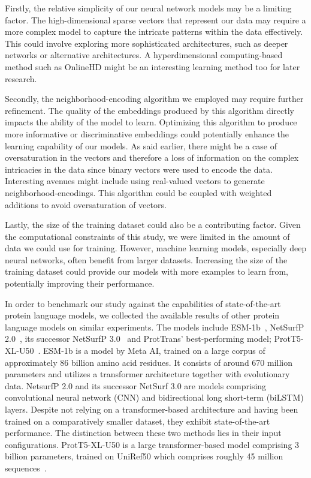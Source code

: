 Firstly, the relative simplicity of our neural network models may be a limiting factor. The high-dimensional sparse vectors that represent our data may require a more complex model to capture the intricate patterns within the data effectively. This could involve exploring more sophisticated architectures, such as deeper networks or alternative architectures. A hyperdimensional computing-based method such as OnlineHD might be an interesting learning method too for later research.

Secondly, the neighborhood-encoding algorithm we employed may require further refinement. The quality of the embeddings produced by this algorithm directly impacts the ability of the model to learn. Optimizing this algorithm to produce more informative or discriminative embeddings could potentially enhance the learning capability of our models. As said earlier, there might be a case of oversaturation in the vectors and therefore a loss of information on the complex intricacies in the data since binary vectors were used to encode the data. Interesting avenues might include using real-valued vectors to generate neighborhood-encodings. This algorithm could be coupled with weighted additions to avoid oversaturation of vectors.

Lastly, the size of the training dataset could also be a contributing factor. Given the computational constraints of this study, we were limited in the amount of data we could use for training. However, machine learning models, especially deep neural networks, often benefit from larger datasets. Increasing the size of the training dataset could provide our models with more examples to learn from, potentially improving their performance.

In order to benchmark our study against the capabilities of state-of-the-art protein language models, we collected the available results of other protein language models on similar experiments. The models include ESM-1b~\cite{esm}, NetSurfP 2.0~\cite{netsurf}, its successor NetSurfP 3.0~\cite{netsurf3} and ProtTrans' best-performing model; ProtT5-XL-U50~\cite{prottrans}. ESM-1b is a model by Meta AI, trained on a large corpus of approximately 86 billion amino acid residues. It consists of around 670 million parameters and utilizes a transformer architecture together with evolutionary data. NetsurfP 2.0 and its successor NetSurf 3.0 are models comprising convolutional neural network (CNN) and bidirectional long short-term (biLSTM) layers. Despite not relying on a transformer-based architecture and having been trained on a comparatively smaller dataset, they exhibit state-of-the-art performance. The distinction between these two methods lies in their input configurations. ProtT5-XL-U50 is a large transformer-based model comprising 3 billion parameters, trained on UniRef50 which comprises roughly 45 million sequences~\cite{uniref}.

